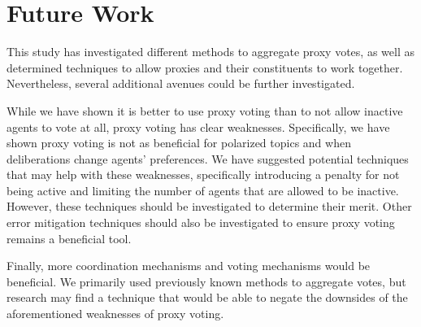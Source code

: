 \section{Future Work}\label{sec:future-work}
This study has investigated different methods to aggregate proxy votes, as well as
determined techniques to allow proxies and their constituents to work together.
Nevertheless, several additional avenues could be further investigated.

While we have shown it is better to use proxy voting than to not allow
inactive agents to vote at all, proxy voting has clear weaknesses.
Specifically, we have shown proxy voting is not as beneficial for polarized
topics and when deliberations change agents' preferences.
We have suggested potential techniques that may help with these weaknesses,
specifically introducing a penalty for not being active and limiting the number of
agents that are allowed to be inactive.
However, these techniques should be investigated to determine their merit.
Other error mitigation techniques should also be investigated to ensure proxy voting
remains a beneficial tool.

Finally, more coordination mechanisms and voting mechanisms would be beneficial.
We primarily used previously known methods to aggregate votes, but research may
find a technique that would be able to negate the downsides of the aforementioned
weaknesses of proxy voting.
